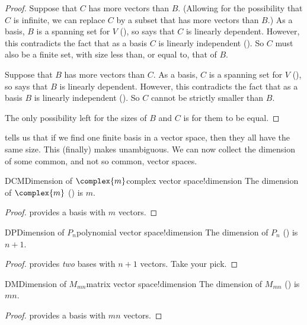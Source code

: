 %
\begin{proof}
Suppose that $C$ has more vectors than $B$.  (Allowing for the possibility that $C$ is infinite, we can replace $C$ by a subset that has more vectors than $B$.)  As a basis, $B$ is a spanning set for $V$ (), so  says that $C$ is linearly dependent.  However, this contradicts the fact that as a basis $C$ is linearly independent ().  So $C$ must also be a finite set, with size less than, or equal to, that of $B$.\par
%
Suppose that $B$ has more vectors than $C$.   As a basis, $C$ is a spanning set for $V$ (), so  says that $B$ is linearly dependent.  However, this contradicts the fact that as a basis $B$ is linearly independent ().  So $C$ cannot be strictly smaller than $B$.\par
%
The only possibility left for the sizes of $B$ and $C$ is for them to be equal.
%
\end{proof}
%
 tells us that if we find one finite basis in a vector space, then they all have the same size.  This (finally) makes  unambiguous.
%
%
We can now collect the dimension of some common, and not so common, vector spaces.
%
%
\begin{theorem}{DCM}{Dimension of $\complex{m}$}{complex vector space!dimension}
The dimension of $\complex{m}$ () is $m$.
\end{theorem}
%
\begin{proof}
 provides a basis with $m$ vectors.
\end{proof}
%
\begin{theorem}{DP}{Dimension of $P_n$}{polynomial vector space!dimension}
The dimension of $P_{n}$  () is $n+1$.
\end{theorem}
%
\begin{proof}
 provides {\em two} bases with $n+1$ vectors.  Take your pick.
\end{proof}
%
\begin{theorem}{DM}{Dimension of $M_{mn}$}{matrix vector space!dimension}
The dimension of $M_{mn}$  () is $mn$.
\end{theorem}
%
\begin{proof}
 provides a basis with $mn$ vectors.
\end{proof}

